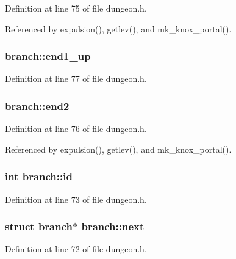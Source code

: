 Definition at line 75 of file dungeon.\+h.



Referenced by expulsion(), getlev(), and mk\+\_\+knox\+\_\+portal().

\hypertarget{structbranch_aa468bd347d9b729f8a5da2e6096c4f20}{
\subsubsection[{end1\+\_\+up}]{ branch\+::end1\+\_\+up}}\label{structbranch_aa468bd347d9b729f8a5da2e6096c4f20}


Definition at line 77 of file dungeon.\+h.

\hypertarget{structbranch_ae943c130ab49b7d1281034ce23e84977}{
\subsubsection[{end2}]{ branch\+::end2}}\label{structbranch_ae943c130ab49b7d1281034ce23e84977}


Definition at line 76 of file dungeon.\+h.



Referenced by expulsion(), getlev(), and mk\+\_\+knox\+\_\+portal().

\hypertarget{structbranch_a1cb5491cdb47419b84edc85bbf178d33}{
\subsubsection[{id}]{\setlength{\rightskip}{0pt plus 5cm}int branch\+::id}}\label{structbranch_a1cb5491cdb47419b84edc85bbf178d33}


Definition at line 73 of file dungeon.\+h.

\hypertarget{structbranch_a2d875e643e7793fda05ce9ae5ccf92a6}{
\subsubsection[{next}]{\setlength{\rightskip}{0pt plus 5cm}struct {\bf branch}$\ast$ branch\+::next}}\label{structbranch_a2d875e643e7793fda05ce9ae5ccf92a6}


Definition at line 72 of file dungeon.\+h.

